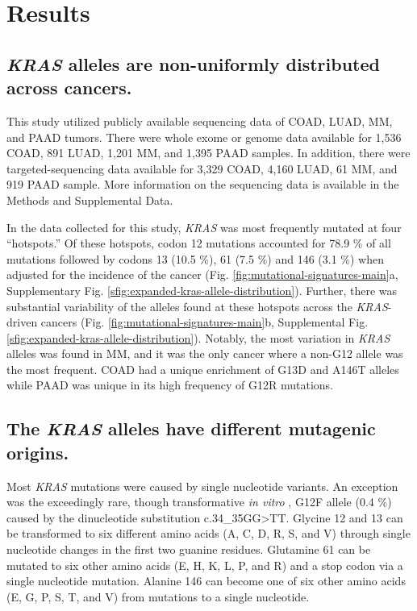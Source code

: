 \documentclass[english, 10pt, letterpaper]{article}
\newcommand{\KRAS}{\emph{KRAS}}
\begin{document}
\section*{Results}

\subsection*{\KRAS{} alleles are non-uniformly distributed across cancers.}

This study utilized publicly available sequencing data of COAD, LUAD, MM, and PAAD tumors.
There were whole exome or genome data available for 1,536 COAD, 891 LUAD, 1,201 MM, and 1,395 PAAD samples.
In addition, there were targeted-sequencing data available for 3,329 COAD, 4,160 LUAD, 61 MM, and 919 PAAD sample.
More information on the sequencing data is available in the Methods and Supplemental Data.

In the data collected for this study, \KRAS{} was most frequently mutated at four “hotspots.” 
Of these hotspots, codon 12 mutations accounted for 78.9 \% of all mutations followed by codons 13 (10.5 \%), 61 (7.5 \%) and 146 (3.1 \%) when adjusted for the incidence of the cancer (Fig. \ref{fig:mutational-signatures-main}a, Supplementary Fig. \ref{sfig:expanded-kras-allele-distribution}).
Further, there was substantial variability of the alleles found at these hotspots across the \KRAS{}-driven cancers (Fig. \ref{fig:mutational-signatures-main}b, Supplemental Fig. \ref{sfig:expanded-kras-allele-distribution}). 
Notably, the most variation in \KRAS{} alleles was found in MM, and it was the only cancer where a non-G12 allele was the most frequent. 
COAD had a unique enrichment of G13D and A146T alleles while PAAD was unique in its high frequency of G12R mutations.


\subsection*{The \KRAS{} alleles have different mutagenic origins.}

Most \KRAS{} mutations were caused by single nucleotide variants.
An exception was the exceedingly rare, though transformative \emph{in vitro} \cite{Barbacid1987}, G12F allele (0.4 \%) caused by the dinucleotide substitution c.34\_35GG>TT.
Glycine 12 and 13 can be transformed to six different amino acids (A, C, D, R, S, and V) through single nucleotide changes in the first two guanine residues.
Glutamine 61 can be mutated to six other amino acids (E, H, K, L, P, and R) and a stop codon via a single nucleotide mutation.
Alanine 146 can become one of six other amino acids (E, G, P, S, T, and V) from mutations to a single nucleotide.
\end{document}
